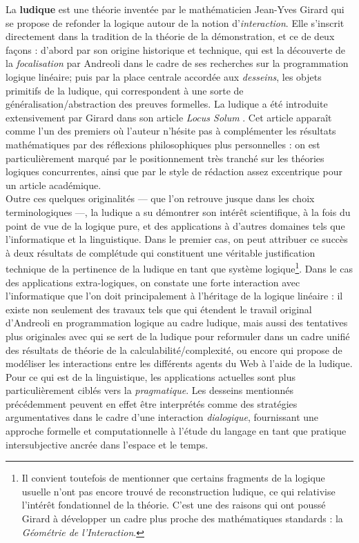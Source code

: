 \documentclass[11pt]{report}
\begin{document}
La \textbf{ludique} est une théorie inventée par le mathématicien Jean-Yves Girard qui se propose de refonder la logique autour de la notion d'\emph{interaction}. Elle s'inscrit directement dans la tradition de la théorie de la démonstration, et ce de deux façons : d'abord par son origine historique et technique, qui est la découverte de la \emph{focalisation} par Andreoli \cite{And92} dans le cadre de ses recherches sur la programmation logique linéaire; puis par la place centrale accordée aux \emph{desseins}, les objets primitifs de la ludique, qui correspondent à une sorte de généralisation/abstraction des preuves formelles. La ludique a été introduite extensivement par Girard dans son article \textit{Locus Solum} \cite{Gir01}. Cet article apparaît comme l'un des premiers où l'auteur n'hésite pas à complémenter les résultats mathématiques par des réflexions philosophiques plus personnelles : on est particulièrement marqué par le positionnement très tranché sur les théories logiques concurrentes, ainsi que par le style de rédaction assez excentrique pour un article académique.\\

Outre ces quelques originalités --- que l'on retrouve jusque dans les choix terminologiques ---, la ludique a su démontrer son intérêt scientifique, à la fois du point de vue de la logique pure, et des applications à d'autres domaines tels que l'informatique et la linguistique. Dans le premier cas, on peut attribuer ce succès à deux résultats de complétude qui constituent une véritable justification technique de la pertinence de la ludique en tant que système logique\footnote{Il convient toutefois de mentionner que certains fragments de la logique usuelle n'ont pas encore trouvé de reconstruction ludique, ce qui relativise l'intérêt fondationnel de la théorie. C'est une des raisons qui ont poussé Girard à développer un cadre plus proche des mathématiques standards : la \textit{Géométrie de l'Interaction}.}. Dans le cas des applications extra-logiques, on constate une forte interaction avec l'informatique que l'on doit principalement à l'héritage de la logique linéaire : il existe non seulement des travaux tels que \cite{Sau08} qui étendent le travail original d'Andreoli en programmation logique au cadre ludique, mais aussi des tentatives plus originales avec \cite{Ter11} qui se sert de la ludique pour reformuler dans un cadre unifié des résultats de théorie de la calculabilité/complexité, ou encore \cite{Fou11} qui propose de modéliser les interactions entre les différents agents du Web à l'aide de la ludique. Pour ce qui est de la linguistique, les applications actuelles sont plus particulièrement ciblés vers la \emph{pragmatique}. Les desseins mentionnés précédemment peuvent en effet être interprétés comme des stratégies argumentatives dans le cadre d'une interaction \emph{dialogique}, fournissant une approche formelle et computationnelle à l'étude du langage en tant que pratique intersubjective ancrée dans l'espace et le temps.\\
\end{document}

